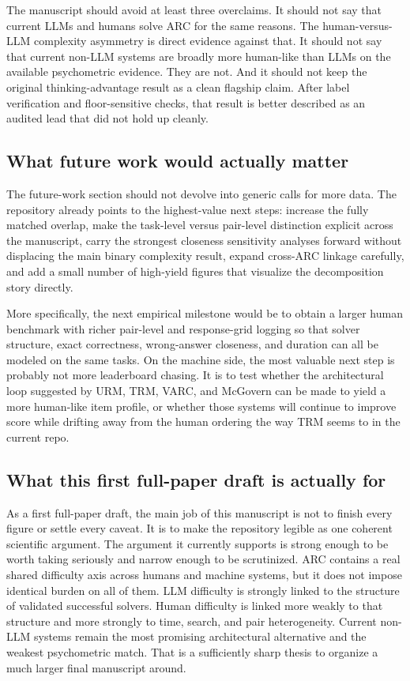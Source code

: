The manuscript should avoid at least three overclaims. It should not say that current LLMs and humans solve ARC for the same reasons. The human-versus-LLM complexity asymmetry is direct evidence against that. It should not say that current non-LLM systems are broadly more human-like than LLMs on the available psychometric evidence. They are not. And it should not keep the original thinking-advantage result as a clean flagship claim. After label verification and floor-sensitive checks, that result is better described as an audited lead that did not hold up cleanly.

\subsection{What future work would actually matter}

The future-work section should not devolve into generic calls for more data. The repository already points to the highest-value next steps: increase the fully matched overlap, make the task-level versus pair-level distinction explicit across the manuscript, carry the strongest closeness sensitivity analyses forward without displacing the main binary complexity result, expand cross-ARC linkage carefully, and add a small number of high-yield figures that visualize the decomposition story directly.

More specifically, the next empirical milestone would be to obtain a larger human benchmark with richer pair-level and response-grid logging so that solver structure, exact correctness, wrong-answer closeness, and duration can all be modeled on the same tasks. On the machine side, the most valuable next step is probably not more leaderboard chasing. It is to test whether the architectural loop suggested by URM, TRM, VARC, and McGovern can be made to yield a more human-like item profile, or whether those systems will continue to improve score while drifting away from the human ordering the way TRM seems to in the current repo.

\subsection{What this first full-paper draft is actually for}

As a first full-paper draft, the main job of this manuscript is not to finish every figure or settle every caveat. It is to make the repository legible as one coherent scientific argument. The argument it currently supports is strong enough to be worth taking seriously and narrow enough to be scrutinized. ARC contains a real shared difficulty axis across humans and machine systems, but it does not impose identical burden on all of them. LLM difficulty is strongly linked to the structure of validated successful solvers. Human difficulty is linked more weakly to that structure and more strongly to time, search, and pair heterogeneity. Current non-LLM systems remain the most promising architectural alternative and the weakest psychometric match. That is a sufficiently sharp thesis to organize a much larger final manuscript around.
